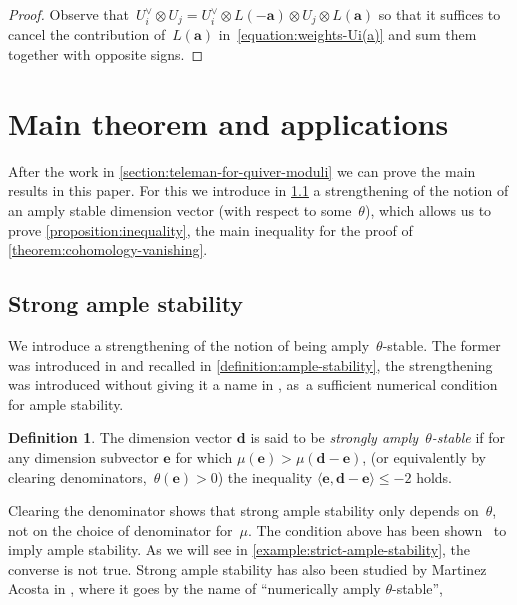\documentclass[11pt]{article}
\theoremstyle{plain}
\theoremstyle{definition}
\newtheorem{definition}[theorem]{Definition}
\newcommand\tuple[1]{\ensuremath{{\boldsymbol{#1}}}}
\begin{document}
\begin{proof}
Observe that~$U_i^\vee\otimes U_j=U_i^\vee\otimes L(-\tuple{a})\otimes U_j\otimes L(\tuple{a})$
so that it suffices to cancel the contribution of~$L(\tuple{a})$ in~\eqref{equation:weights-Ui(a)}
and sum them together with opposite signs.
\end{proof}

\section{Main theorem and applications}
\label{section:results}
After the work in \cref{section:teleman-for-quiver-moduli}
we can prove the main results in this paper.
For this we introduce in \cref{subsection:strong-ample-stability}
a strengthening of the notion of
an amply stable dimension vector (with respect to some~$\theta$),
which allows us to prove \cref{proposition:inequality},
the main inequality for the proof of \cref{theorem:cohomology-vanishing}.

\subsection{Strong ample stability}
\label{subsection:strong-ample-stability}
We introduce a strengthening of the notion of being amply~$\theta$-stable.
The former was introduced in \cite[Def.\,4.1]{MR3683503}
and recalled in \cref{definition:ample-stability},
the strengthening was introduced without giving it a name in \cite[Prop.\,5.1]{MR3683503}, as~a sufficient numerical condition for ample stability.
\begin{definition}
\label{definition:strong-ample-stability}
The dimension vector $\tuple{d}$ is said to be \emph{strongly amply~$\theta$-stable}
if for any dimension subvector $\tuple{e}$ for which $\mu(\tuple{e}) > \mu(\tuple{d} - \tuple{e})$,
(or equivalently by clearing denominators,~$\theta(\tuple{e})>0$)
the inequality $\langle \tuple{e}, \tuple{d} - \tuple{e} \rangle \leq -2$ holds.
\end{definition}
Clearing the denominator shows that strong ample stability only depends on~$\theta$,
not on the choice of denominator for~$\mu$.
The condition above has been shown~\cite[Prop.\,5.1]{MR3683503} to imply ample stability.
As we will see in \cref{example:strict-ample-stability}, the converse is not true.
Strong ample stability has also been studied by Martinez Acosta in \cite{karen},
where it goes by the name of ``numerically amply $\theta$-stable'',
\end{document}
